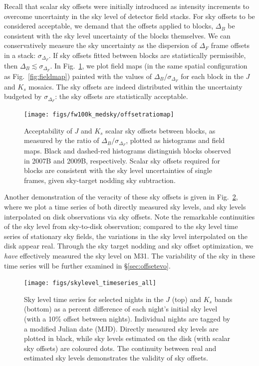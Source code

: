 \documentclass[iop]{emulateapj}
\newcommand{\Fig}[1]{Fig.~\ref{fig:#1}}  %
\newcommand{\Sec}[1]{\S\ref{sec:#1}}  %
\begin{document}
Recall that scalar sky offsets were initially introduced as intensity increments to overcome uncertainty in the sky level of detector field stacks.
For sky offsets to be considered acceptable, we demand that the offsets applied to blocks, $\Delta_B$ be consistent with the sky level uncertainty of the blocks themselves.
We can conservatively measure the sky uncertainty as the dispersion of $\Delta_F$ frame offsets in a stack: $\sigma_{\Delta_F}$.
If sky offsets fitted between blocks are statistically permissible, then $\Delta_B \lesssim \sigma_{\Delta_F}$.
In \Fig{offset_ratio_map}, we plot field maps (in the same spatial configuration as \Fig{fieldmap}) painted with the values of $\Delta_B / \sigma_{\Delta_F}$ for each block in the $J$ and $K_s$ mosaics.
The sky offsets are indeed distributed within the uncertainty budgeted by $\sigma_{\Delta_F}$: the sky offsets are statistically acceptable.

\begin{figure}[t]
\centering
\texttt{[image: figs/fw100k\_medsky/offsetratiomap]}
\caption{Acceptability of $J$ and $K_s$ scalar sky offsets between blocks, as measured by the ratio of $\Delta_B/\sigma_{\Delta_F}$, plotted as histograms and field maps. Black and dashed-red histograms distinguish blocks observed in 2007B and 2009B, respectively. Scalar sky offsets required for blocks are consistent with the sky level uncertainties of single frames, given sky-target nodding sky subtraction.}
\label{fig:offset_ratio_map}
\end{figure}

Another demonstration of the veracity of these sky offsets is given in \Fig{skylevel_timeseries}, where we plot a time series of both directly measured sky levels, and sky levels interpolated on disk observations via sky offsets.
Note the remarkable continuities of the sky level from sky-to-disk observation; compared to the sky level time series of stationary sky fields, the variations in the sky level interpolated on the disk appear real.
Through the sky target nodding and sky offset optimization, we \emph{have} effectively measured the sky level on M31.
The variability of the sky in these time series will be further examined in \Sec{offsetevo}.

\begin{figure}[t]
\centering
\texttt{[image: figs/skylevel\_timeseries\_all]}
\caption{Sky level time series for selected nights in the $J$ (top) and $K_s$ bands (bottom) as a percent difference of each night's initial sky level (with a 10\% offset between nights).
Individual nights are tagged by a modified Julian date (MJD).
Directly measured sky levels are plotted in black, while sky levels estimated on the disk (with scalar sky offsets) are coloured dots. The continuity between real and estimated sky levels demonstrates the validity of sky offsets.}
\label{fig:skylevel_timeseries}
\end{figure}
\end{document}
